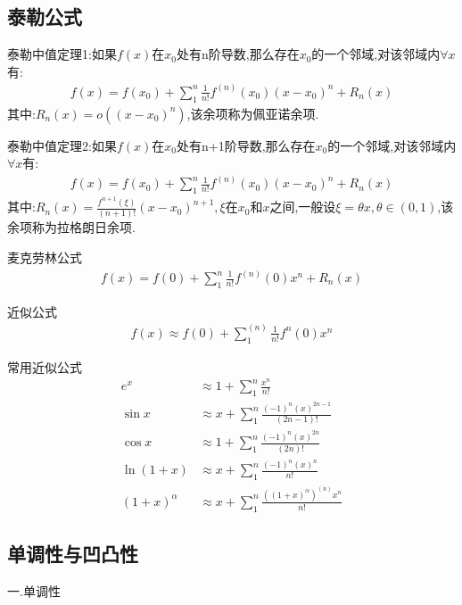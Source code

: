 \documentclass[utf8]{ctexart}
\begin{document}
\subsection{\heiti 泰勒公式}

泰勒中值定理1:如果$f(x)$在$x_{0}$处有n阶导数,那么存在$x_{0}$的一个邻域,对该邻域内$\forall x$有:
\begin{align}
    f(x)=f(x_{0})+\displaystyle\sum_{1}^{ n }\frac{1}{n!}f^{(n)}(x_{0})(x-x_{0})^{n}+R_{n}(x)  
\end{align}
其中:$R_{n}(x)=o((x-x_{0})^{n})$,该余项称为佩亚诺余项.

泰勒中值定理2:如果$f(x)$在$x_{0}$处有n+1阶导数,那么存在$x_{0}$的一个邻域,对该邻域内$\forall x$有:
\begin{align}
    f(x)=f(x_{0})+\displaystyle\sum_{1}^{ n }\frac{1}{n!}f^{(n)}(x_{0})(x-x_{0})^{n}+R_{n}(x)  
\end{align}
其中:$R_{n}(x)=\displaystyle\frac{f^{n+1}(\xi )}{(n+1)!}(x-x_{0})^{n+1},\xi \text{在}x_0\text{和}x\text{之间}$,一般设$\xi =\theta x,\theta \in(0,1)$,该余项称为拉格朗日余项.

麦克劳林公式
\begin{align}
    f(x)=f(0)+\displaystyle\sum_{1}^{n}\frac{1}{n!}f^{(n)}(0)x^{n}+R_{n}(x)  
\end{align}

近似公式
\begin{align}
    f(x)\approx f(0)+\displaystyle\sum_{1}^{(n)}\frac{1}{n!}f^{n}(0)x^{n} 
\end{align}

常用近似公式
\begin{align}
    e^x&\approx 1+\displaystyle\sum_{1}^{n}\frac{x^{n}}{n!}\\
    \sin x&\approx x+\displaystyle\sum_{1}^{n}\frac{(-1)^{n}(x)^{2n-1}}{(2n-1)!}\\
    \cos x&\approx 1+\displaystyle\sum_{1}^{n}\frac{(-1)^{n}(x)^{2n}}{(2n)!}\\
    \ln (1+x)&\approx x+\displaystyle\sum_{1}^{n}\frac{(-1)^{n}(x)^{n}}{n!}\\
    (1+x)^{\alpha}&\approx x+\displaystyle\sum_{1}^{n}\frac{ ((1+x)^{\alpha})^{(n)}x^{n}}{n!}
\end{align}

\subsection{\heiti 单调性与凹凸性}

一.单调性
\end{document}
